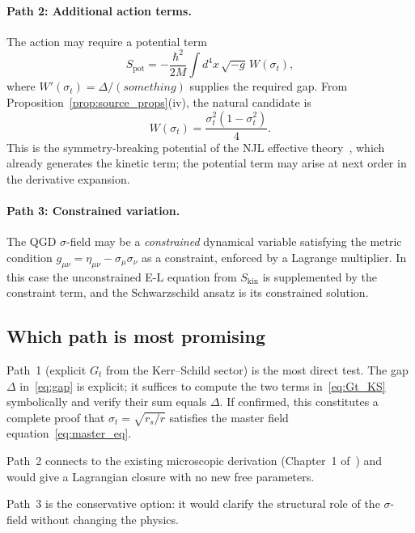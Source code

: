 \documentclass[11pt,a4paper]{article}
\theoremstyle{plain}
\theoremstyle{definition}
\newcommand{\sig}{\sigma}
\newcommand{\sigt}{\sigma_t}
\newcommand{\rs}{r_s}
\newcommand{\Skin}{S_{\mathrm{kin}}}
\begin{document}
\paragraph{Path 2: Additional action terms.}
The action may require a potential term
\begin{equation}\label{eq:S_pot}
  S_{\mathrm{pot}} = -\frac{\hbar^2}{2M}\int d^4x\,\sqrt{-g}\,W(\sigt),
\end{equation}
where $W'(\sigt) = \Delta/(something)$ supplies the required gap.
From Proposition~\ref{prop:source_props}(iv), the natural candidate is
\begin{equation}
  W(\sigt) = \frac{\sigt^2(1-\sigt^2)}{4}.
\end{equation}
This is the symmetry-breaking potential of the NJL
effective theory~\cite{matshaba2026:kin}, which already generates
the kinetic term; the potential term may arise at next order in the
derivative expansion.

\paragraph{Path 3: Constrained variation.}
The QGD $\sigma$-field may be a \emph{constrained} dynamical variable
satisfying the metric condition
$g_{\mu\nu} = \eta_{\mu\nu} - \sig_\mu\sig_\nu$ as a constraint,
enforced by a Lagrange multiplier.  In this case the unconstrained
E-L equation from $\Skin$ is supplemented by the constraint term,
and the Schwarzschild ansatz is its constrained solution.

\subsection{Which path is most promising}

Path~1 (explicit $G_t$ from the Kerr--Schild sector) is the most
direct test.  The gap $\Delta$ in~\eqref{eq:gap} is explicit; it
suffices to compute the two terms in~\eqref{eq:Gt_KS} symbolically
and verify their sum equals $\Delta$.  If confirmed, this constitutes
a complete proof that $\sigt = \sqrt{\rs/r}$ satisfies the master
field equation~\eqref{eq:master_eq}.

Path~2 connects to the existing microscopic derivation (Chapter~1
of~\cite{matshaba2026}) and would give a Lagrangian closure with
no new free parameters.

Path~3 is the conservative option: it would clarify the structural
role of the $\sigma$-field without changing the physics.
\end{document}
